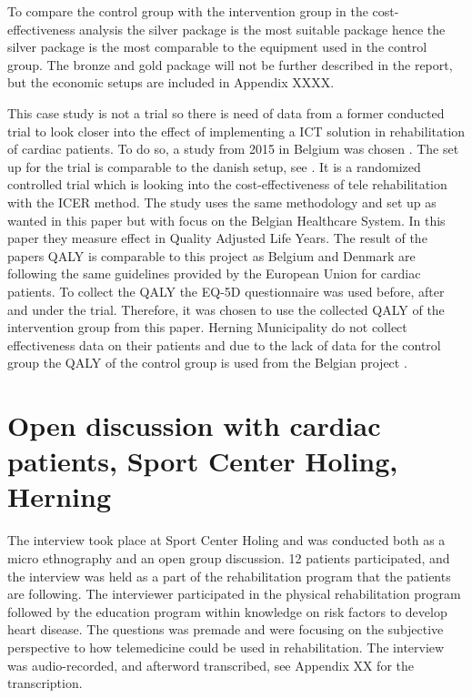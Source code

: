 To compare the control group with the intervention group in the cost-effectiveness analysis the silver package is the most suitable package hence the silver package is the most comparable to the equipment used in the control group. The bronze and gold package will not be further described in the report, but the economic setups are included in Appendix XXXX.

This case study is not a trial so there is need of data from a former conducted trial to look closer into the effect of implementing a ICT solution in rehabilitation of cardiac patients. To do so, a study from 2015 in Belgium was chosen \cite{costeffect}. The set up for the trial is comparable to the danish setup, see . It is a randomized controlled trial which is looking into the cost-effectiveness of tele rehabilitation with the ICER method. The study uses the same methodology and set up as wanted in this paper but with focus on the Belgian Healthcare System. In this paper they measure effect in Quality Adjusted Life Years. The result of the papers QALY is comparable to this project as Belgium and Denmark are following the same guidelines provided by the European Union for cardiac patients. To collect the QALY the EQ-5D questionnaire was used before, after and under the trial. Therefore, it was chosen to use the collected QALY of the intervention group from this paper. Herning Municipality do not collect effectiveness data on their patients and due to the lack of data for the control group the QALY of the control group is used from the Belgian project \cite{costeffect}.

\section{Open discussion with cardiac patients, Sport Center Holing, Herning}
\label{patientinterview} 

The interview took place at Sport Center Holing and was conducted both as a micro ethnography and an open group discussion. 12 patients participated, and the interview was held as a part of the rehabilitation program that the patients are following.  The interviewer participated in the physical rehabilitation program followed by the education program within knowledge on risk factors to develop heart disease. The questions was premade and were focusing on the subjective perspective to how telemedicine could be used in rehabilitation. The interview was audio-recorded, and afterword transcribed, see Appendix XX for the transcription. 

